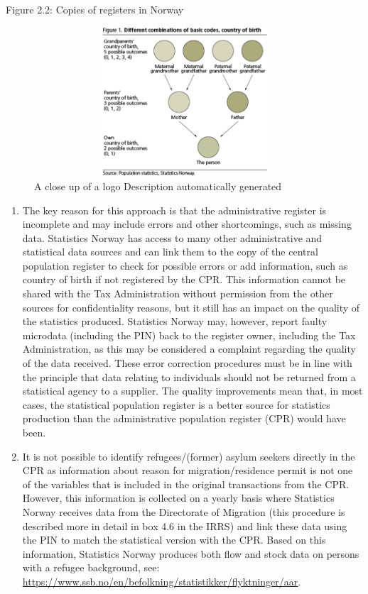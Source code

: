 \documentclass[
]{article}
\begin{document}
Figure 2.2: Copies of registers in Norway

\begin{figure}
\centering
\includegraphics[width=4.50625in,height=2.19514in]{media/image25.png}
\caption{A close up of a logo Description automatically
generated}
\end{figure}

\begin{enumerate}
\def\labelenumi{\arabic{enumi}.}
\setcounter{enumi}{254}
\item
  The key reason for this approach is that the administrative
  register is incomplete and may include errors and other
  shortcomings, such as missing data. Statistics Norway has access to
  many other administrative and statistical data sources and can link
  them to the copy of the central population register to check for
  possible errors or add information, such as country of birth if not
  registered by the CPR. This information cannot be shared with the
  Tax Administration without permission from the other sources for
  confidentiality reasons, but it still has an impact on the quality
  of the statistics produced. Statistics Norway may, however, report
  faulty microdata (including the PIN) back to the register owner,
  including the Tax Administration, as this may be considered a
  complaint regarding the quality of the data received. These error
  correction procedures must be in line with the principle that data
  relating to individuals should not be returned from a statistical
  agency to a supplier. The quality improvements mean that, in most
  cases, the statistical population register is a better source for
  statistics production than the administrative population register
  (CPR) would have been.
\item
  It is not possible to identify refugees/(former) asylum seekers
  directly in the CPR as information about reason for
  migration/residence permit is not one of the variables that is
  included in the original transactions from the CPR. However, this
  information is collected on a yearly basis where Statistics Norway
  receives data from the Directorate of Migration (this procedure is
  described more in detail in box 4.6 in the IRRS) and link these data
  using the PIN to match the statistical version with the CPR. Based
  on this information, Statistics Norway produces both flow and stock
  data on persons with a refugee background, see:
  \url{https://www.ssb.no/en/befolkning/statistikker/flyktninger/aar}{.}
\end{enumerate}
\end{document}
